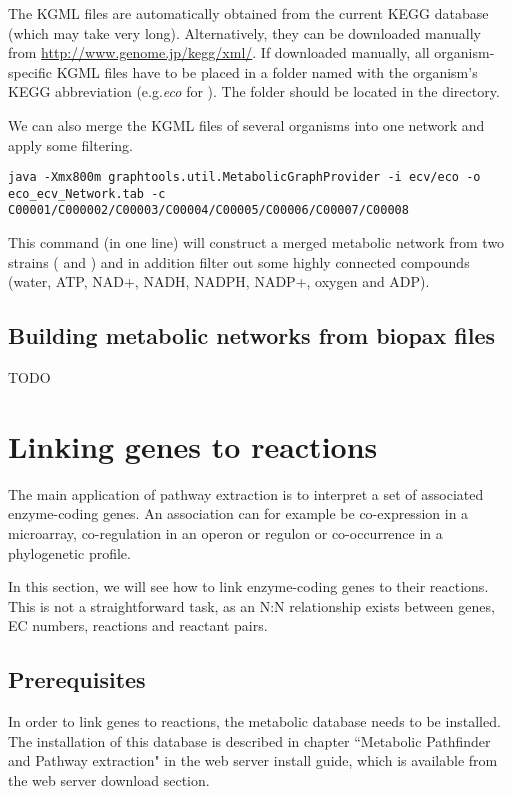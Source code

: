 The KGML files are automatically obtained from the current KEGG database
(which may take very long). Alternatively, they can be downloaded manually from
\url{http://www.genome.jp/kegg/xml/}.
If downloaded manually, all organism-specific KGML files have to be placed in a
folder named with the organism's KEGG abbreviation (e.g.\textit{eco}
for ). The folder should be located in the \RSAT{}
directory.
 
We can also merge the KGML files of several organisms into one network and apply
some filtering.

\begin{verbatim}
java -Xmx800m graphtools.util.MetabolicGraphProvider -i ecv/eco -o
eco_ecv_Network.tab -c C00001/C000002/C00003/C00004/C00005/C00006/C00007/C00008
\end{verbatim}

This command (in one line) will construct a merged metabolic network from two
 strains ( and ) 
and in addition filter out some highly connected compounds (water, ATP, NAD+, NADH, NADPH, NADP+, oxygen and ADP).

\subsection{Building metabolic networks from biopax files}

TODO

\section{Linking genes to reactions}

The main application of pathway extraction is to interpret a set of
associated enzyme-coding genes. An association can for example be co-expression
in a microarray, co-regulation in an operon or regulon or co-occurrence in a
phylogenetic profile.

In this section, we will see how to link enzyme-coding genes to their reactions.
This is not a straightforward task, as an N:N relationship exists between genes,
EC numbers, reactions and reactant pairs.

\subsection{Prerequisites}\label{metabolicdb}
In order to link genes to reactions, the metabolic database needs to be
installed. The installation of this database is described in chapter
``Metabolic Pathfinder and Pathway extraction" in the \neat web server install
guide, which is available from the \neat web server download section. 

